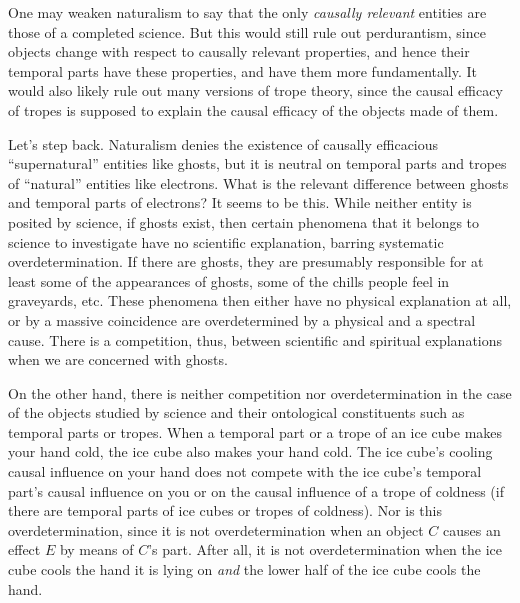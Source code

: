 One may weaken naturalism to say that the only \textit{causally relevant} entities are those of a completed science. But 
this would still rule out perdurantism, since objects change with respect to causally relevant properties, and hence their
temporal parts have these properties, and have them more fundamentally. It would also likely rule out many versions of trope
theory, since the causal efficacy of tropes is supposed to explain the causal efficacy of the objects made of them.

Let's step back. Naturalism denies the existence of causally efficacious ``supernatural'' entities like 
ghosts, but it is neutral on temporal parts and tropes of ``natural'' entities like electrons. 
What is the relevant difference between ghosts and temporal parts of electrons? It seems to be this. While
neither entity is posited by science, if ghosts exist, then certain phenomena that it belongs to science 
to investigate have no scientific explanation, barring systematic overdetermination. If there are ghosts,
they are presumably responsible for at least some of the appearances of ghosts, some of the chills people
feel in graveyards, etc. These phenomena then either have no physical explanation at all, or by a massive
coincidence are overdetermined by a physical and a spectral cause. There is a competition, thus, between 
scientific and spiritual explanations when we are concerned with ghosts. 

On the other hand, there is neither
competition nor overdetermination in the case of the objects studied by science and their ontological
constituents such as temporal parts or tropes. When a temporal part or a trope of an ice cube makes 
your hand cold, the ice cube also makes your hand cold. The ice cube's cooling causal influence on your hand
does not compete with the ice cube's temporal part's causal influence on you or on the causal influence of 
a trope of coldness (if there are temporal parts of ice cubes or tropes of coldness). Nor is this overdetermination,
since it is not overdetermination when an object $C$ causes an effect $E$ by means of $C$'s part. After all,
it is not overdetermination when the ice cube cools the hand it is lying on \textit{and} the lower half of 
the ice cube cools the hand. 

